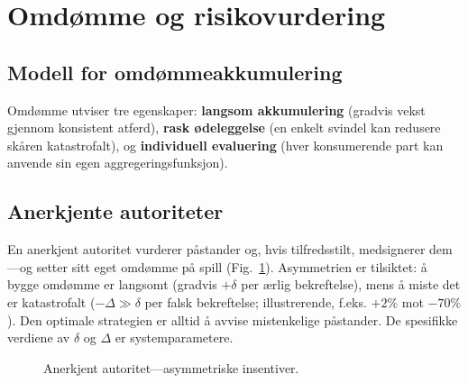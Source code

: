 \documentclass[11pt,a4paper,twocolumn]{article}
\begin{document}
\section{Omdømme og risikovurdering}

\subsection{Modell for omdømmeakkumulering}

Omdømme utviser tre egenskaper: \textbf{langsom akkumulering} (gradvis vekst gjennom konsistent atferd), \textbf{rask ødeleggelse} (en enkelt svindel kan redusere skåren katastrofalt), og \textbf{individuell evaluering} (hver konsumerende part kan anvende sin egen aggregeringsfunksjon).

\subsection{Anerkjente autoriteter}

En anerkjent autoritet vurderer påstander og, hvis tilfredsstilt, medsignerer dem---og setter sitt eget omdømme på spill (Fig.~\ref{fig:authority}). Asymmetrien er tilsiktet: å bygge omdømme er langsomt (gradvis $+\delta$ per ærlig bekreftelse), mens å miste det er katastrofalt ($-\Delta \gg \delta$ per falsk bekreftelse; illustrerende, f.eks. $+2\%$ mot $-70\%$). Den optimale strategien er alltid å avvise mistenkelige påstander. De spesifikke verdiene av $\delta$ og $\Delta$ er systemparametere.

\begin{figure}[ht]
\centering
{}
\caption{Anerkjent autoritet---asymmetriske insentiver.}
\label{fig:authority}
\end{figure}
\end{document}
